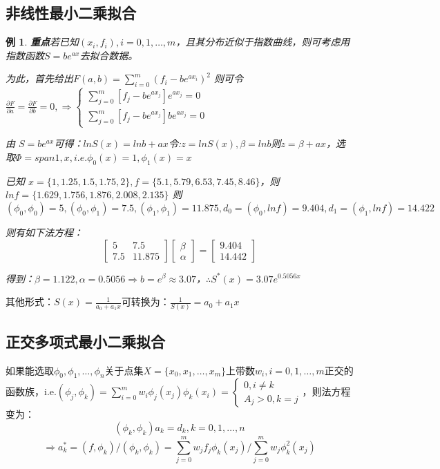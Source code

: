 \documentclass[a4paper]{article}
\newtheorem{example}{例}[section]
\begin{document}
\subsection{非线性最小二乘拟合}
\begin{example}
    \textbf{重点}若已知$(x_i, f_i), i=0,1,\dots, m$，且其分布近似于指数曲线，则可考虑用指数函数$S=be^{ax}$去拟合数据。
    
    为此，首先给出$F(a,b)=\sum^m_{i=0} (f_i-be^{ax_i})^2 $
    则可令$\frac{\partial F}{\partial a} = \frac{\partial F}{\partial b}=0, \Rightarrow \left\{
    \begin{array}{lr}
        \sum^m_{j=0}[f_j-be^{ax_j}]e^{ax_j}=0 \\
        \sum^m_{j=0}[f_j-be^{ax_j}]be^{ax_j}=0
    \end{array}    
     \right. $
     
     由 $S=be^{ax} $可得：$lnS(x)=lnb+ax $令:$z=lnS(x), \beta=lnb$则$z=\beta + ax$，选取$\Phi = span{1, x}, i.e. \phi_0(x)=1, \phi_1(x)=x$

     已知 $x = \{1, 1.25, 1.5, 1.75, 2\}, f = \{5.1, 5.79, 6.53, 7.45, 8.46\}$，则$lnf =\{1.629, 1.756, 1.876, 2.008, 2.135\} $ 则
     $(\phi_0, \phi_0) = 5, (\phi_0, \phi_1) = 7.5, (\phi_1, \phi_1) = 11.875, d_0 = (\phi_0, lnf) = 9.404, d_1=(\phi_1, lnf) = 14.422$

     则有如下法方程：
     $$\left[
         \begin{matrix}
             5 & 7.5 \\
             7.5 & 11.875 
         \end{matrix}
         \right]\left[
             \begin{matrix}
                 \beta \\ \alpha 
             \end{matrix}
             \right]=
             \left[
                 \begin{matrix}
                     9.404 \\ 14.442
                 \end{matrix}
                 \right]$$
    
    得到：$\beta = 1.122, \alpha = 0.5056 \Rightarrow b = e^\beta \approx 3.07$，$\therefore S^*(x)=3.07e^{0.5056x} $
\end{example}

其他形式：$S(x) = \frac{1}{a_0+a_1x}$可转换为：$\frac{1}{S(x)} = a_0+a_1x$

\subsection{正交多项式最小二乘拟合}
如果能选取$\phi_0, \phi_1, \dots, \phi_n$关于点集$X=\{x_0, x_1, \dots, x_m\}$上带数$w_i, i=0,1,\dots, m$正交的函数族，i.e.$(\phi_j, \phi_k)=\sum^m_{i=0}w_i\phi_j(x_j)\phi_k(x_i)=\left\{
    \begin{array}{lr}
        0, i\neq k \\
        A_j > 0 , k=j
    \end{array}
    \right. $，则法方程变为：
    $$(\phi_k, \phi_k)a_k = d_k, k=0,1,\dots, n$$
    $$\Rightarrow a^*_k=(f,\phi_k)/(\phi_k, \phi_k) = \sum^m_{j=0}w_jf_j\phi_k(x_j)/\sum^m_{j=0}w_j\phi_k^2(x_j) $$
\end{document}
